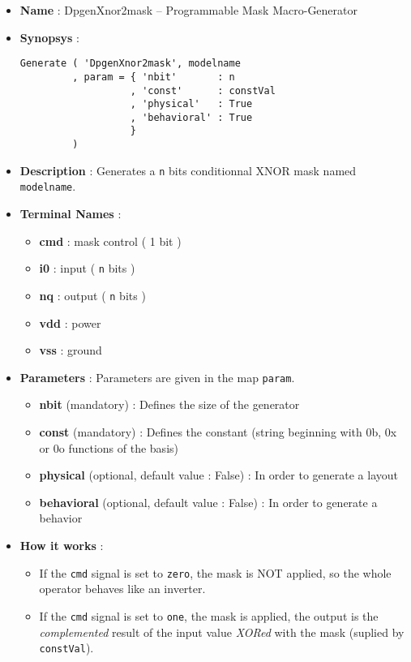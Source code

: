\begin{itemize}
    \item \textbf{Name} : DpgenXnor2mask -- Programmable Mask Macro-Generator
    \item \textbf{Synopsys} :
\begin{verbatim}
Generate ( 'DpgenXnor2mask', modelname
         , param = { 'nbit'       : n
                   , 'const'      : constVal
                   , 'physical'   : True
                   , 'behavioral' : True                   
                   }
         )
\end{verbatim}
    \item \textbf{Description} : Generates a \verb-n- bits conditionnal XNOR mask named \verb-modelname-.
    \item \textbf{Terminal Names} :
    \begin{itemize}
        \item \textbf{cmd} : mask control ( 1 bit )
        \item \textbf{i0} : input ( \verb-n- bits )
        \item \textbf{nq} : output ( \verb-n- bits )
        \item \textbf{vdd} : power
        \item \textbf{vss} : ground
    \end{itemize}
    \item \textbf{Parameters} : Parameters are given in the map \verb-param-.
    \begin{itemize}
        \item \textbf{nbit} (mandatory) : Defines the size of the generator
        \item \textbf{const} (mandatory) : Defines the constant (string beginning with 0b, 0x or 0o functions of the basis)
        \item \textbf{physical} (optional, default value : False) : In order to generate a layout
        \item \textbf{behavioral} (optional, default value : False) : In order to generate a behavior        
    \end{itemize}
    \item \textbf{How it works} :
    \begin{itemize}
        \item If the \verb-cmd- signal is set to \verb-zero-, the mask is NOT applied, so the whole operator behaves like an inverter.
        \item If the \verb-cmd- signal is set to \verb-one-, the mask is applied, the output is the \emph{complemented} result of the input value \emph{XORed} with the mask (suplied by \verb-constVal-).

\end{itemize}
\end{itemize}
